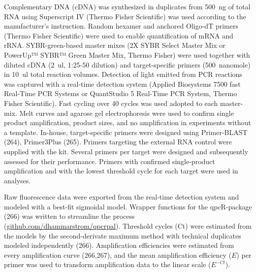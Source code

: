 \documentclass[twoside,10pt]{gihclass} %
\begin{document}
Complementary DNA (cDNA) was synthesized in duplicates from \SI{500}{ng} of total RNA using Superscript IV (Thermo Fisher Scientific) was used according to the manufacturer's instruction. Random hexamer and anchored Oligo-dT primers (Thermo Fisher Scientific) were used to enable quantification of mRNA and rRNA.
SYBR-green-based master mixes (2X SYBR Select Master Mix or PowerUp™ SYBR™ Green Master Mix, Thermo Fisher) were used together with diluted cDNA (\SI{2}{ul}, 1:25-50 dilution) and target-specific primers (\SI{500}{nanomole}) in \SI{10}{ul} total reaction volumes. Detection of light emitted from PCR reactions was captured with a real-time detection system (Applied Biosystems 7500 fast Real-Time PCR Systems or QuantStudio 5 Real-Time PCR System, Thermo Fisher Scientific). Fast cycling over 40 cycles was used adopted to each master-mix. Melt curves and agarose gel electrophoresis were used to confirm single product amplification, product sizes, and no amplification in experiments without a template.
In-house, target-specific primers were designed using Primer-BLAST (264), Primer3Plus (265). Primers targeting the external RNA control were supplied with the kit. Several primers per target were designed and subsequently assessed for their performance. Primers with confirmed single-product amplification and with the lowest threshold cycle for each target were used in analyses.

Raw fluorescence data were exported from the real-time detection system and modeled with a best-fit sigmoidal model.
Wrapper functions for the qpcR-package (266) was written to streamline the process
(\href{http://www.github.com/dhammarstrom/qpcrpal}{github.com/dhammarstrom/qpcrpal}).
Threshold cycles (Ct) were estimated from the models by the second-derivate maximum method with technical duplicates modeled independently (266).
Amplification efficiencies were estimated from every amplification curve
(266,267),
and the mean amplification efficiency (\(E\)) per primer was used to transform amplification data to the linear scale (\(E^{-Ct}\)).
\end{document}
